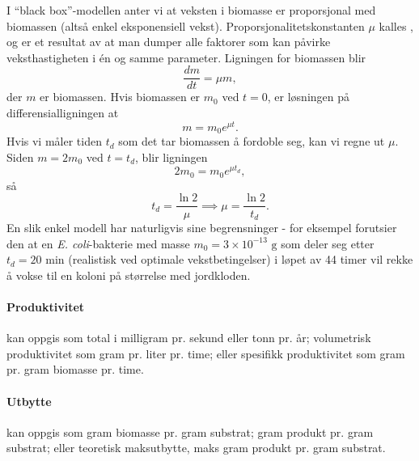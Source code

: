 I ``black box''-modellen anter vi at veksten i biomasse er proporsjonal med biomassen (altså enkel eksponensiell vekst). Proporsjonalitetskonstanten $\mu$ kalles , og er et resultat av at man dumper alle faktorer som kan påvirke veksthastigheten i én og samme parameter. Ligningen for biomassen blir
\begin{equation*}
	\frac{dm}{dt}=\mu m,
\end{equation*}
der $m$ er biomassen. Hvis biomassen er $m_0$ ved $t=0$, er løsningen på differensialligningen at
\begin{equation*}
	m=m_0e^{\mu t}.
\end{equation*}
Hvis vi måler tiden $t_d$ som det tar biomassen å fordoble seg, kan vi regne ut $\mu$. Siden $m=2m_0$ ved $t=t_d$, blir ligningen
\begin{equation*}
	2m_0=m_0e^{\mu t_d},
\end{equation*}
så
\begin{equation*}
	t_d=\frac{\ln 2}{\mu}\implies\mu=\frac{\ln 2}{t_d}.
\end{equation*}
En slik enkel modell har naturligvis sine begrensninger - for eksempel forutsier den at en \emph{E. coli}-bakterie med masse $m_0=3\times10^{-13}\text{ g}$ som deler seg etter $t_d=20\text{ min}$ (realistisk ved optimale vekstbetingelser) i løpet av 44 timer vil rekke å vokse til en koloni på størrelse med jordkloden.

\paragraph{Produktivitet} kan oppgis som total  i milligram pr. sekund eller tonn pr. år; volumetrisk produktivitet som gram pr. liter pr. time; eller spesifikk produktivitet som gram pr. gram biomasse pr. time.

\paragraph{Utbytte} kan oppgis som gram biomasse pr. gram substrat; gram produkt pr. gram substrat; eller teoretisk maksutbytte, maks gram produkt pr. gram substrat.

